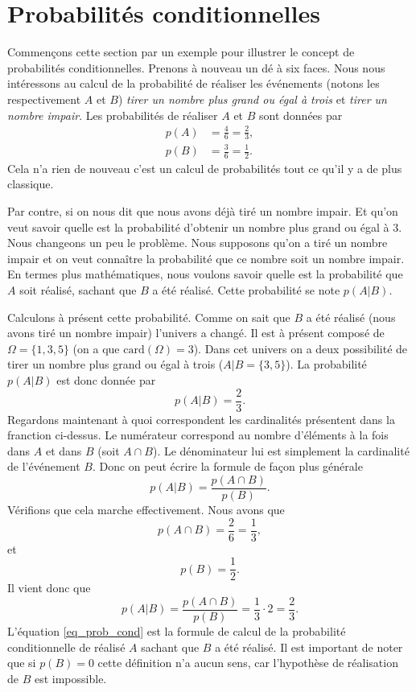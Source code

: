 \documentclass[a4paper,12pt]{book}
\newcommand{\card}{\mathrm{card}}
\begin{document}
\section{Probabilités conditionnelles}

Commençons cette section par un exemple pour illustrer le concept de probabilités conditionnelles. 
Prenons à nouveau un dé à six faces. Nous nous intéressons au calcul de la probabilité de réaliser les événements
(notons les respectivement $A$ et $B$) \textit{tirer un nombre plus grand ou égal à trois} et \textit{tirer un nombre impair}.
Les probabilités de réaliser $A$ et $B$ sont données par
\begin{align}
 p(A)&=\frac{4}{6}=\frac{2}{3},\\
 p(B)&=\frac{3}{6}=\frac{1}{2}.
\end{align}
Cela n'a rien de nouveau c'est un calcul de probabilités tout ce qu'il y a de plus classique.

Par contre, si on nous dit que nous avons déjà tiré un nombre impair. 
Et qu'on veut savoir quelle est la probabilité d'obtenir un nombre plus grand ou égal à 3.
Nous changeons un peu le problème. Nous supposons qu'on a tiré un nombre impair et on veut connaître la probabilité
que ce nombre soit un nombre impair. En termes plus mathématiques, nous voulons savoir quelle est la probabilité que $A$
soit réalisé, sachant que $B$ a été réalisé. Cette probabilité se note $p(A|B)$.

Calculons à présent cette probabilité. Comme on sait que $B$ a été réalisé (nous avons tiré un nombre impair) l'univers
a changé. Il est à présent composé de $\Omega=\{1,3,5\}$ (on a que $\card(\Omega)=3$). Dans cet univers on a deux possibilité de tirer 
un nombre plus grand ou égal à trois ($A|B=\{3,5\}$). La probabilité $p(A|B)$ est donc donnée par
\begin{equation}
 p(A|B)=\frac{2}{3}.
\end{equation}
Regardons maintenant à quoi correspondent les cardinalités présentent dans la franction ci-dessus.
Le numérateur correspond au nombre d'éléments à la fois dans $A$ et dans $B$ (soit $A\cap B$). Le dénominateur lui
est simplement la cardinalité de l'événement $B$. Donc on peut écrire la formule de façon 
plus générale
\begin{equation}
 p(A|B)=\frac{p(A\cap B)}{p(B)}.\label{eq_prob_cond}
\end{equation}
Vérifions que cela marche effectivement. Nous avons que 
\begin{equation}
 p(A\cap B)=\frac{2}{6}=\frac{1}{3},
\end{equation}
et 
\begin{equation}
 p(B)=\frac{1}{2}.
\end{equation}
Il vient donc que 
\begin{equation}
 p(A|B)=\frac{p(A\cap B)}{p(B)}=\frac{1}{3}\cdot 2=\frac{2}{3}.
\end{equation}
L'équation \eqref{eq_prob_cond} est la formule de calcul de la probabilité conditionnelle de réalisé $A$ sachant 
que $B$ a été réalisé. Il est important de noter que si $p(B)=0$ cette définition n'a aucun sens, car l'hypothèse de réalisation de $B$
est impossible.
\end{document}
